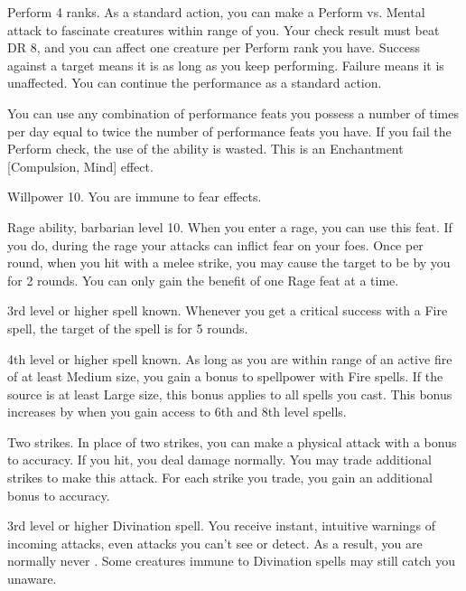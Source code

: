 \featpre Perform 4 ranks.
\featben As a standard action, you can make a Perform vs. Mental attack to fascinate creatures within \rngmed range of you.
Your check result must beat DR 8, and you can affect one creature per Perform rank you have.
Success against a target means it is \fascinated as long as you keep performing.
Failure means it is unaffected.
You can continue the performance as a standard action.

You can use any combination of performance feats you possess a number of times per day equal to twice the number of performance feats you have.
If you fail the Perform check, the use of the ability is wasted.
This is an Enchantment [Compulsion, Mind] effect.

\featpre Willpower 10.
\featben You are immune to fear effects.

\featpre Rage ability, barbarian level 10.
\featben When you enter a rage, you can use this feat. If you do, during the rage your attacks can inflict fear on your foes.
Once per round, when you hit with a melee strike, you may cause the target to be \shaken by you for 2 rounds.
 You can only gain the benefit of one Rage feat at a time.

\featpre 3rd level or higher  spell known.
\featben Whenever you get a critical success with a Fire spell, the target of the spell is \ignited for 5 rounds.

\featpre 4th level or higher  spell known.
\featben As long as you are within \rngmed range of an active fire of at least Medium size, you gain a  bonus to spellpower with Fire spells.
If the source is at least Large size, this bonus applies to all spells you cast.
This bonus increases by  when you gain access to 6th and 8th level spells.

\featpre Two strikes.
\featben In place of two strikes, you can make a physical attack with a  bonus to accuracy.
If you hit, you deal damage normally.
You may trade additional strikes to make this attack.
For each strike you trade, you gain an additional  bonus to accuracy.

\featpre 3rd level or higher Divination spell.
\featben You receive instant, intuitive warnings of incoming attacks, even attacks you can't see or detect.
As a result, you are normally never \unaware.
Some creatures immune to Divination spells may still catch you unaware.

